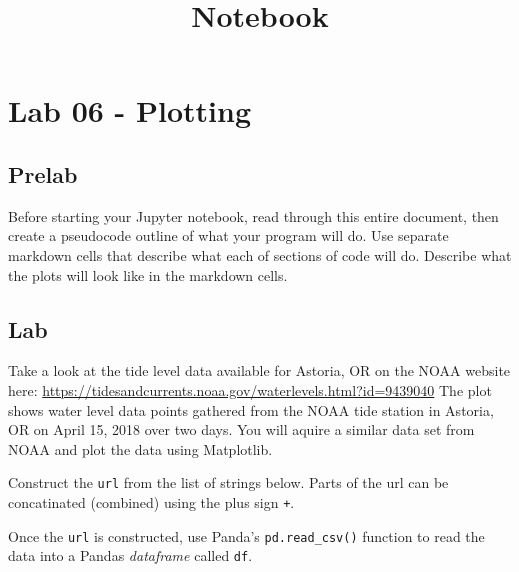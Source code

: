 \documentclass[11pt]{article}
\title{Notebook}
\begin{document}
    
    
    

    
    

    
    \hypertarget{lab-06---plotting}{%
\section{Lab 06 - Plotting}\label{lab-06---plotting}}

    \hypertarget{prelab}{%
\subsection{Prelab}\label{prelab}}

Before starting your Jupyter notebook, read through this entire
document, then create a pseudocode outline of what your program will do.
Use separate markdown cells that describe what each of sections of code
will do. Describe what the plots will look like in the markdown cells.

    \hypertarget{lab}{%
\subsection{Lab}\label{lab}}

Take a look at the tide level data available for Astoria, OR on the NOAA
website here:
\url{https://tidesandcurrents.noaa.gov/waterlevels.html?id=9439040} The
plot shows water level data points gathered from the NOAA tide station
in Astoria, OR on April 15, 2018 over two days. You will aquire a
similar data set from NOAA and plot the data using Matplotlib.

Construct the \texttt{url} from the list of strings below. Parts of the
url can be concatinated (combined) using the plus sign \texttt{+}.

Once the \texttt{url} is constructed, use Panda's
\texttt{pd.read\_csv()} function to read the data into a Pandas
\emph{dataframe} called \texttt{df}.
\end{document}
